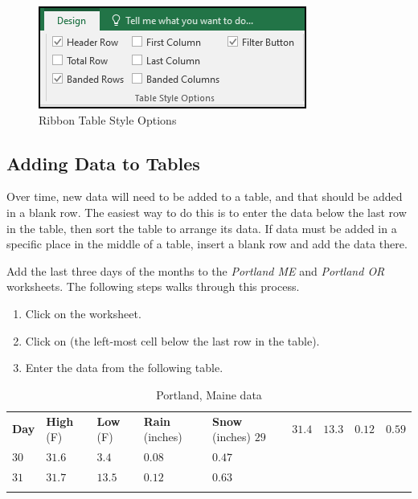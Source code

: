 \begin{figure}[H]
	\centering
	\includegraphics[width=\maxwidth{.65\linewidth}]{gfx/ch05_fig05}
	\caption{Ribbon Table Style Options}
	\label{05:fig05}
\end{figure}

\subsection{Adding Data to Tables}

Over time, new data will need to be added to a table, and that should be added in a blank row. The easiest way to do this is to enter the data below the last row in the table, then sort the table to arrange its data. If data must be added in a specific place in the middle of a table, insert a blank row and add the data there.

Add the last three days of the months to the \textit{Portland ME} and \textit{Portland OR} worksheets. The following steps walks through this process.

\begin{enumerate}
	\item Click on the  worksheet.
	\item Click on  (the left-most cell below the last row in the table).
	\item Enter the data from the following table.
\end{enumerate}

\begin{table}[H]
	{\small
		\begin{longtable}{R{0.50in}R{0.50in}R{0.50in}R{0.50in}R{0.50in}} %
			\textbf{Day} & \textbf{High} (\textdegree F) & \textbf{Low} (\textdegree F) & \textbf{Rain} (inches) & \textbf{Snow} (inches) \endhead
			\hline
			$ 29 $ & $ 31.4 $ & $ 13.3 $ & $ 0.12 $ & $ 0.59 $ \\ 
			$ 30 $ & $ 31.6 $ & $ 3.4  $ & $ 0.08 $ & $ 0.47 $ \\ 
			$ 31 $ & $ 31.7 $ & $ 13.5 $ & $ 0.12 $ & $ 0.63 $ \\ 
			\caption{Portland, Maine data}
			\label{05:tab02}
		\end{longtable}
	} %
\end{table}

